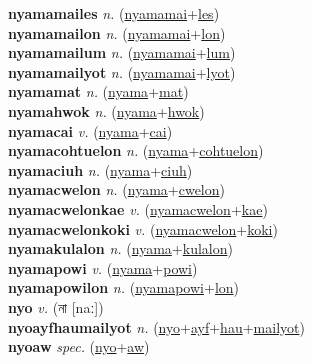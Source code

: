 \textbf{nyamamailes} \textit{n.} (\hyperref[nyamamai]{nyamamai}+\hyperref[les]{les})
 \label{nyamamailes} \\
\textbf{nyamamailon} \textit{n.} (\hyperref[nyamamai]{nyamamai}+\hyperref[lon]{lon})
 \label{nyamamailon} \\
\textbf{nyamamailum} \textit{n.} (\hyperref[nyamamai]{nyamamai}+\hyperref[lum]{lum})
 \label{nyamamailum} \\
\textbf{nyamamailyot} \textit{n.} (\hyperref[nyamamai]{nyamamai}+\hyperref[lyot]{lyot})
 \label{nyamamailyot} \\
\textbf{nyamamat} \textit{n.} (\hyperref[nyama]{nyama}+\hyperref[mat]{mat})
 \label{nyamamat} \\
\textbf{nyamahwok} \textit{n.} (\hyperref[nyama]{nyama}+\hyperref[hwok]{hwok})
 \label{nyamahwok} \\
\textbf{nyamacai} \textit{v.} (\hyperref[nyama]{nyama}+\hyperref[cai]{cai})
 \label{nyamacai} \\
\textbf{nyamacohtuelon} \textit{n.} (\hyperref[nyama]{nyama}+\hyperref[cohtuelon]{cohtuelon})
 \label{nyamacohtuelon} \\
\textbf{nyamaciuh} \textit{n.} (\hyperref[nyama]{nyama}+\hyperref[ciuh]{ciuh})
 \label{nyamaciuh} \\
\textbf{nyamacwelon} \textit{n.} (\hyperref[nyama]{nyama}+\hyperref[cwelon]{cwelon})
 \label{nyamacwelon} \\
\textbf{nyamacwelonkae} \textit{v.} (\hyperref[nyamacwelon]{nyamacwelon}+\hyperref[kae]{kae})
 \label{nyamacwelonkae} \\
\textbf{nyamacwelonkoki} \textit{v.} (\hyperref[nyamacwelon]{nyamacwelon}+\hyperref[koki]{koki})
 \label{nyamacwelonkoki} \\
\textbf{nyamakulalon} \textit{n.} (\hyperref[nyama]{nyama}+\hyperref[kulalon]{kulalon})
 \label{nyamakulalon} \\
\textbf{nyamapowi} \textit{v.} (\hyperref[nyama]{nyama}+\hyperref[powi]{powi})
 \label{nyamapowi} \\
\textbf{nyamapowilon} \textit{n.} (\hyperref[nyamapowi]{nyamapowi}+\hyperref[lon]{lon})
 \label{nyamapowilon} \\
\textbf{nyo} \textit{v.} ({\bengali{}না} [naː])
 \label{nyo} \\
\textbf{nyoayfhaumailyot} \textit{n.} (\hyperref[nyo]{nyo}+\hyperref[ayf]{ayf}+\hyperref[hau]{hau}+\hyperref[mailyot]{mailyot})
 \label{nyoayfhaumailyot} \\
\textbf{nyoaw} \textit{spec.} (\hyperref[nyo]{nyo}+\hyperref[aw]{aw})
